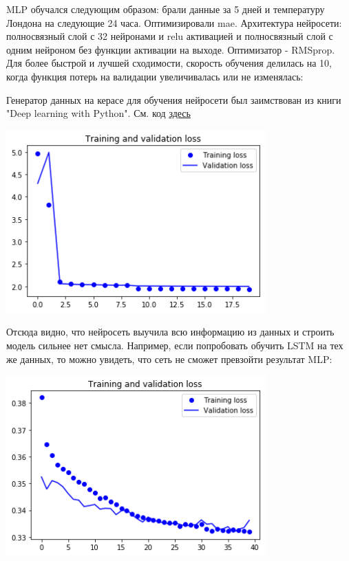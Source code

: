 \documentclass[11pt]{article}
\begin{document}
MLP обучался следующим образом: брали данные за 5 дней и температуру Лондона на следующие 24 часа. Оптимизировали mae.
Архитектура нейросети: полносвязный слой с 32 нейронами и relu активацией и полносвязный слой с одним нейроном без
функции активации на выходе. Оптимизатор - RMSprop. Для более быстрой и лучшей сходимости, скорость обучения делилась
на 10, когда функция потерь на валидации увеличивалась или не изменялась:

Генератор данных на керасе для обучения нейросети был заимствован из книги "Deep learning with Python". См. код \href{https://github.com/fchollet/deep-learning-with-python-notebooks/blob/master/6.3-advanced-usage-of-recurrent-neural-networks.ipynb}{здесь}



\begin{center}
\includegraphics[width=10cm]{./pics/mlp_loss.png}
\end{center}

Отсюда видно, что нейросеть выучила всю информацию из данных и строить модель сильнее нет смысла. Например, если
попробовать обучить LSTM на тех же данных, то можно увидеть, что сеть не сможет превзойти результат MLP:
\begin{center}
\includegraphics[width=10cm]{./pics/lstm_loss.png}
\end{center}
\end{document}
